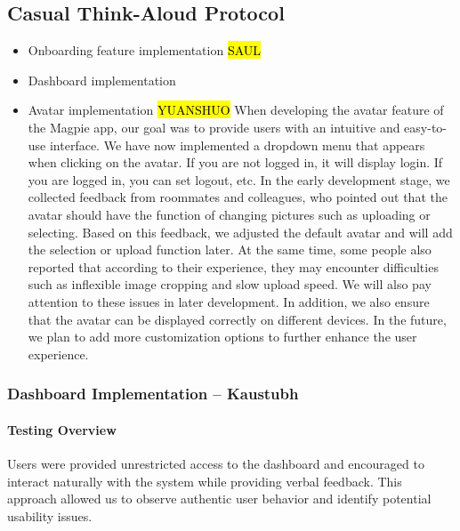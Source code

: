 \documentclass{report}
\begin{document}
\subsection{Casual Think-Aloud Protocol}
\begin{itemize}
    \item Onboarding feature implementation \hl{SAUL}
    \item Dashboard implementation \\
    \item Avatar implementation \hl{YUANSHUO}
    When developing the avatar feature of the Magpie app, our goal was to provide users with an intuitive and easy-to-use interface. We have now implemented a dropdown menu that appears when clicking on the avatar. If you are not logged in, it will display login. If you are logged in, you can set logout, etc. In the early development stage, we collected feedback from roommates and colleagues, who pointed out that the avatar should have the function of changing pictures such as uploading or selecting. Based on this feedback, we adjusted the default avatar and will add the selection or upload function later. At the same time, some people also reported that according to their experience, they may encounter difficulties such as inflexible image cropping and slow upload speed. We will also pay attention to these issues in later development. In addition, we also ensure that the avatar can be displayed correctly on different devices. In the future, we plan to add more customization options to further enhance the user experience.
\end{itemize}
\subsubsection{Dashboard Implementation -- Kaustubh}
\paragraph{Testing Overview}  
Users were provided unrestricted access to the dashboard and encouraged to interact naturally with the system while providing verbal feedback. This approach allowed us to observe authentic user behavior and identify potential usability issues.
\end{document}
